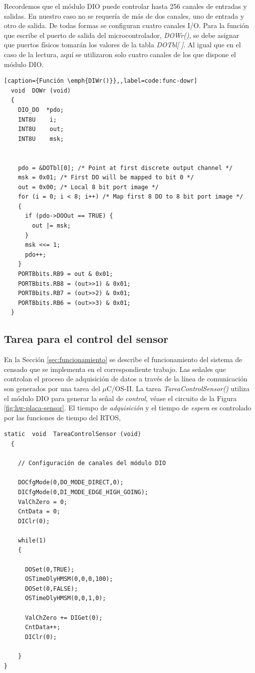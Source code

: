 \documentclass[11pt,a4paper,oneside]{article}
\def\uCOS{$\mu$C/OS-II\texttrademark}
\begin{document}
Recordemos que el módulo DIO puede controlar hasta 256 canales de entradas y salidas. En nuestro caso no se requería de más de dos canales, uno de entrada y otro de salida. De todas formas se configuran cuatro canales I/O. Para la función que escribe el puerto de salida del microcontrolador, \emph{DOWr()}, se debe asignar que puertos físicos tomarán los valores de la tabla \emph{DOTbl[ ]}. Al igual que en el caso de la lectura, aquí se utilizaron solo cuatro canales de los que dispone el módulo DIO.

\begin{lstlisting}[caption={Función \emph{DIWr()}},,label=code:func-dowr]
  void  DOWr (void)
  {
    DIO_DO  *pdo;
    INT8U    i;
    INT8U    out;
    INT8U    msk;
    
    
    pdo = &DOTbl[0]; /* Point at first discrete output channel */
    msk = 0x01; /* First DO will be mapped to bit 0 */
    out = 0x00; /* Local 8 bit port image */
    for (i = 0; i < 8; i++) /* Map first 8 DO to 8 bit port image */
    {
      if (pdo->DOOut == TRUE) {
        out |= msk;
      }
      msk <<= 1;
      pdo++;
    }
    PORTBbits.RB9 = out & 0x01;
    PORTBbits.RB8 = (out>>1) & 0x01;
    PORTBbits.RB7 = (out>>2) & 0x01;
    PORTBbits.RB6 = (out>>3) & 0x01;
  }
\end{lstlisting}

\subsection{Tarea para el control del sensor}
\label{sec:tarea-sensor}

En la Sección \ref{sec:funcionamiento} se describe el funcionamiento del sistema de censado que se implementa en el correspondiente trabajo. Las señales que controlan el proceso de adquisición de datos a través de la línea de comunicación son generados por una tarea del \uCOS. La tarea \emph{TareaControlSensor()}  utiliza el módulo DIO para generar la señal de \emph{control}, véase el circuito de la Figura \ref{fig:hw-placa-sensor}. El tiempo de \emph{adquisición} y el tiempo de \emph{espera} es controlado por las funciones de tiempo del RTOS, \emph{}

\begin{lstlisting}[caption={Función de la tarea \emph{TareaControlSensor()}},label=code:func-tareacontrol]
  static  void  TareaControlSensor (void)
  {
    
    // Configuración de canales del módulo DIO
    
    DOCfgMode(0,DO_MODE_DIRECT,0);
    DICfgMode(0,DI_MODE_EDGE_HIGH_GOING);
    ValChZero = 0;
    CntData = 0;
    DIClr(0);
    
    while(1)
    {
      
      DOSet(0,TRUE);
      OSTimeDlyHMSM(0,0,0,100);
      DOSet(0,FALSE);
      OSTimeDlyHMSM(0,0,1,0);
      
      ValChZero += DIGet(0);
      CntData++;
      DIClr(0);
      
    }
}
\end{lstlisting}
\end{document}

